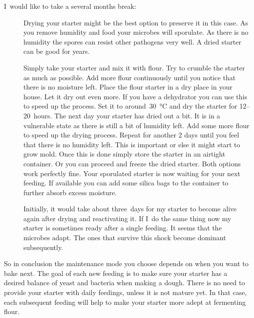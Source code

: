 \begin{description}
\item[I~would like to take a several months break:]
Drying your starter might be the best option to preserve it in this case. As
you remove humidity and food your microbes will sporulate. As there is no
humidity the spores can resist other pathogens very well. A dried starter can
be good for years.

Simply take your starter and mix it with flour. Try to crumble the starter as
much as possible. Add more flour continuously until you notice that there is no
moisture left. Place the flour starter in a dry place in your house. Let it
dry out even more. If you have a dehydrator you can use this to speed up the
process. Set it to around~\qty{30}{\degreeCelsius} and dry the starter for 12--20~hours. The next
day your starter has dried out a bit. It is in a vulnerable state as there is still a bit
of humidity left. Add some more flour to speed up the drying process. Repeat
for another 2 days until you feel that there is no humidity left. This is
important or else it might start to grow mold. Once this is done simply store the
starter in an airtight container. Or you can proceed and freeze
the dried starter. Both options work perfectly fine. Your sporulated starter
is now waiting for your next feeding. If available you can add some silica
bags to the container to further absorb excess moisture.

Initially, it would take about three~days for my starter to become alive again
after drying and reactivating it. If I~do the same thing now my starter is
sometimes ready after a single feeding. It seems that the microbes adapt. The ones
that survive this shock become dominant subsequently.
\end{description}

So in conclusion the maintenance mode you choose depends on when you want to bake next.
The goal of each new feeding is to make sure your starter
has a desired balance of yeast and bacteria when making a dough. There is no need to provide your
starter with daily feedings, unless it is not mature yet. In that case, each
subsequent feeding will help to make your starter more adept at fermenting
flour.
